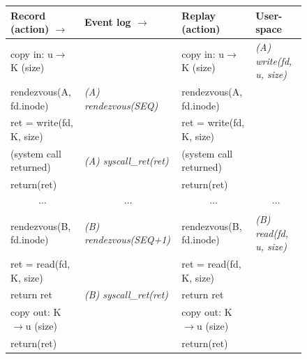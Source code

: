 \begin{figure}[t]
  \scriptsize
  \begin{center}
  \begin{tabular}{lll|l}

    \hline	

    {\bf Record (action) \hfill $\rightarrow$ }
      & {\bf Event log \hfill $\rightarrow$ }
        & {\bf Replay (action)}
          & {\bf User-space}
            \\

    \hline	

    copy in: u$\rightarrow$K (size)
      &
        & copy in: u$\rightarrow$K (size)
          & {\em (A) write(fd, u, size)}
            \\

    rendezvous(A, fd.inode)
      & {\em (A) rendezvous(SEQ)}
        & rendezvous(A, fd.inode)
          &
            \\

    ret = write(fd, K, size)
      &
        & ret = write(fd, K, size)
          &
            \\

    (system call returned)
      & {\em (A) syscall\_ret(ret)}
        & (system call returned)
          &
            \\

    return(ret)
      &
        & return(ret)
          &
            \\

    \multicolumn{1}{c}{ $\cdots$}
      & \multicolumn{1}{c}{ $\cdots$}
        & \multicolumn{1}{c}{ $\cdots$}
          & \multicolumn{1}{|c}{ $\cdots$}
            \\

    rendezvous(B, fd.inode)
      & {\em (B) rendezvous(SEQ+1)}
        & rendezvous(B, fd.inode)
          & {\em (B) read(fd, u, size)}
            \\

    ret = read(fd, K, size)
      &
        & ret = read(fd, K, size)
          &
            \\

    return ret
      & {\em (B) syscall\_ret(ret)}
        & return ret
          &
            \\

    copy out: K$\rightarrow$u (size)
      &
        & copy out: K$\rightarrow$u (size)
          &
            \\

    return(ret)
      &
        & return(ret)
          &
            \\


\end{tabular}
\end{center}
\end{figure}
